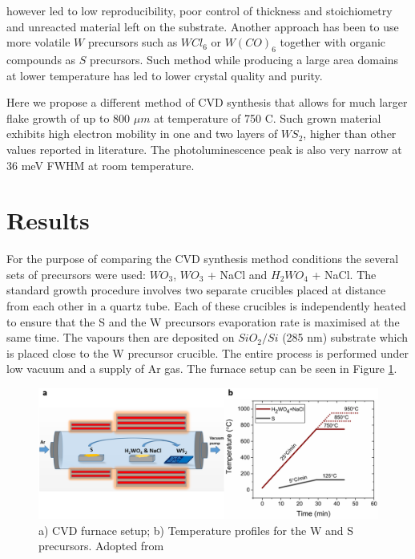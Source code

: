 however led to low reproducibility, poor control of thickness and stoichiometry and unreacted material left on the substrate. Another approach has been to use more volatile $W$ precursors such as $WCl_6$\cite{Carmalt2003} or $W(CO)_6$\cite{Kang2015}\cite{Eichfeld2015} together with organic compounds as $S$ precursors. Such method while producing a large area domains at lower temperature has led to lower crystal quality and purity.

Here we propose a different method of CVD synthesis that allows for much larger flake growth of up to 800 $\mu m$ at temperature of 750 {\degree}C. Such grown material exhibits high electron mobility in one and two layers of $WS_2$, higher than other values reported in literature. The photoluminescence peak is also very narrow at 36 meV FWHM at room temperature. 

\section{Results}
	
For the purpose of comparing the CVD synthesis method conditions the several sets of precursors were used: $WO_3$, $WO_3$ + NaCl and $H_2WO_4$ + NaCl. The standard growth procedure involves two separate crucibles placed at distance from each other in a quartz tube. Each of these crucibles is independently heated to ensure that the S and the W precursors evaporation rate is maximised at the same time. The vapours then are deposited on $SiO_2/Si$ (285 nm) substrate which is placed close to the W precursor crucible. The entire process is performed under low vacuum and a supply of Ar gas. The furnace setup can be seen in Figure \ref{fig:PaperSIFurnace}.

\begin{figure}[h]
	\begin{center}
		\includegraphics[scale=0.3]{PaperSIFurnace.png}
		\caption{a) CVD furnace setup; b) Temperature profiles for the W and S precursors. Adopted from \cite{Reale2017}}
		\label{fig:PaperSIFurnace}
	\end{center}
\end{figure} 


